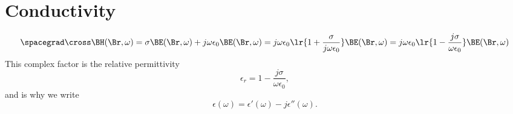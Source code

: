 \section{Conductivity}
%
%
\begin{dmath}\label{eqn:druid:260}
\spacegrad \cross \BH(\Br, \omega)
= \sigma \BE(\Br, \omega) + j \omega \epsilon_0 \BE(\Br, \omega)
= j \omega \epsilon_0 \lr{ 1 + \frac{\sigma}{j \omega \epsilon_0} } \BE(\Br, \omega)
= j \omega \epsilon_0 \lr{ 1 - \frac{j \sigma}{\omega \epsilon_0} } \BE(\Br, \omega)
\end{dmath}
%
This complex factor is the relative permittivity
%
\begin{dmath}\label{eqn:druid:280}
\epsilon_r
= 1 - \frac{j \sigma}{\omega \epsilon_0},
\end{dmath}
%
and is why we write
%
\begin{dmath}\label{eqn:druid:300}
\epsilon(\omega) = \epsilon'(\omega) - j \epsilon''(\omega).
\end{dmath}
%
